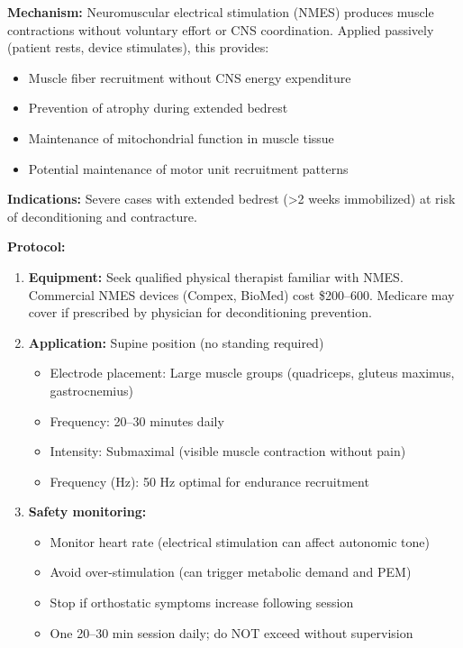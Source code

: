 \begin{recommendation}
\label{rec:nmes-severe}

\textbf{Mechanism:} Neuromuscular electrical stimulation (NMES) produces muscle contractions without voluntary effort or CNS coordination. Applied passively (patient rests, device stimulates), this provides:
\begin{itemize}
    \item Muscle fiber recruitment without CNS energy expenditure
    \item Prevention of atrophy during extended bedrest
    \item Maintenance of mitochondrial function in muscle tissue
    \item Potential maintenance of motor unit recruitment patterns
\end{itemize}

\textbf{Indications:} Severe cases with extended bedrest (>2 weeks immobilized) at risk of deconditioning and contracture.

\textbf{Protocol:}
\begin{enumerate}
    \item \textbf{Equipment:} Seek qualified physical therapist familiar with NMES. Commercial NMES devices (Compex, BioMed) cost \$200--600. Medicare may cover if prescribed by physician for deconditioning prevention.

    \item \textbf{Application:} Supine position (no standing required)
    \begin{itemize}
        \item Electrode placement: Large muscle groups (quadriceps, gluteus maximus, gastrocnemius)
        \item Frequency: 20--30 minutes daily
        \item Intensity: Submaximal (visible muscle contraction without pain)
        \item Frequency (Hz): 50 Hz optimal for endurance recruitment
    \end{itemize}

    \item \textbf{Safety monitoring:}
    \begin{itemize}
        \item Monitor heart rate (electrical stimulation can affect autonomic tone)
        \item Avoid over-stimulation (can trigger metabolic demand and PEM)
        \item Stop if orthostatic symptoms increase following session
        \item One 20--30 min session daily; do NOT exceed without supervision
    \end{itemize}


\end{enumerate}
\end{recommendation}
